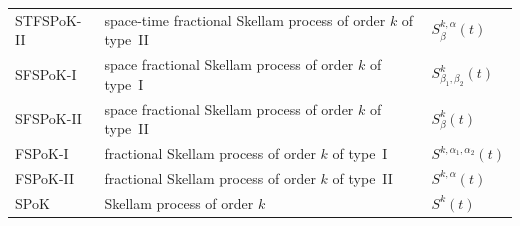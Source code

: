 \documentclass[11pt,oneside,reqno]{amsart}
\theoremstyle{definition}
\theoremstyle{remarkstyle}
\begin{document}
\begin{table}[H]
\begin{tabular}{lll}
STFSPoK-II & space-time fractional Skellam process of order $k$ of type~II & $S^{k,\alpha}_{\beta}(t)$\\
SFSPoK-I & space fractional Skellam process of order $k$ of type~I & $S^{k}_{\beta_1,\beta_2}(t)$\\
SFSPoK-II & space fractional Skellam process of order $k$ of type~II & $S^{k}_{\beta}(t)$\\
FSPoK-I & fractional Skellam process of order $k$ of type~I & $S^{k,\alpha_1,\alpha_2}(t)$\\
FSPoK-II & fractional Skellam process of order $k$ of type~II & $S^{k,\alpha}(t)$\\
SPoK & Skellam process of order $k$ & $S^{k}(t)$\\
\bottomrule
\end{tabular}
\end{table}
\end{document}

